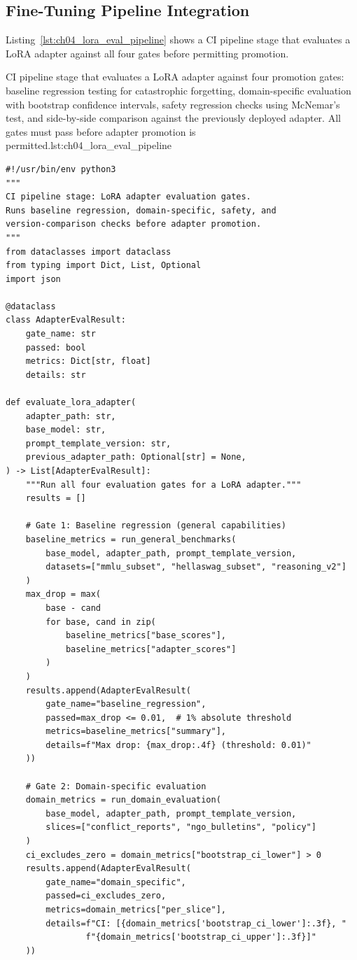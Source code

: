 \subsection{Fine-Tuning Pipeline Integration}
\label{subsec:ch04-finetune-pipeline}

Listing~\ref{lst:ch04_lora_eval_pipeline} shows a CI pipeline stage that evaluates a LoRA adapter against all four gates before permitting promotion.

\begin{codebox}{CI pipeline stage that evaluates a LoRA adapter against four promotion gates: baseline regression testing for catastrophic forgetting, domain-specific evaluation with bootstrap confidence intervals, safety regression checks using McNemar's test, and side-by-side comparison against the previously deployed adapter. All gates must pass before adapter promotion is permitted.}{lst:ch04_lora_eval_pipeline}
\begin{verbatim}
#!/usr/bin/env python3
"""
CI pipeline stage: LoRA adapter evaluation gates.
Runs baseline regression, domain-specific, safety, and
version-comparison checks before adapter promotion.
"""
from dataclasses import dataclass
from typing import Dict, List, Optional
import json

@dataclass
class AdapterEvalResult:
    gate_name: str
    passed: bool
    metrics: Dict[str, float]
    details: str

def evaluate_lora_adapter(
    adapter_path: str,
    base_model: str,
    prompt_template_version: str,
    previous_adapter_path: Optional[str] = None,
) -> List[AdapterEvalResult]:
    """Run all four evaluation gates for a LoRA adapter."""
    results = []

    # Gate 1: Baseline regression (general capabilities)
    baseline_metrics = run_general_benchmarks(
        base_model, adapter_path, prompt_template_version,
        datasets=["mmlu_subset", "hellaswag_subset", "reasoning_v2"]
    )
    max_drop = max(
        base - cand
        for base, cand in zip(
            baseline_metrics["base_scores"],
            baseline_metrics["adapter_scores"]
        )
    )
    results.append(AdapterEvalResult(
        gate_name="baseline_regression",
        passed=max_drop <= 0.01,  # 1% absolute threshold
        metrics=baseline_metrics["summary"],
        details=f"Max drop: {max_drop:.4f} (threshold: 0.01)"
    ))

    # Gate 2: Domain-specific evaluation
    domain_metrics = run_domain_evaluation(
        base_model, adapter_path, prompt_template_version,
        slices=["conflict_reports", "ngo_bulletins", "policy"]
    )
    ci_excludes_zero = domain_metrics["bootstrap_ci_lower"] > 0
    results.append(AdapterEvalResult(
        gate_name="domain_specific",
        passed=ci_excludes_zero,
        metrics=domain_metrics["per_slice"],
        details=f"CI: [{domain_metrics['bootstrap_ci_lower']:.3f}, "
                f"{domain_metrics['bootstrap_ci_upper']:.3f}]"
    ))


\end{verbatim}
\end{codebox}
